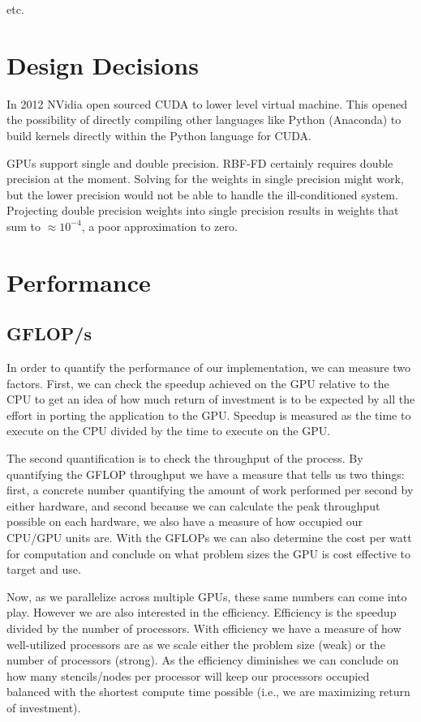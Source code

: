 \documentclass{report}
\begin{document}
\cite{Bell2009} 
\cite{Vuduc2005} etc. 



\section{Design Decisions}

In 2012 NVidia open sourced CUDA to lower level virtual machine. This opened the possibility of directly compiling other languages like Python (Anaconda) to build kernels directly within the Python language for CUDA. 

GPUs support single and double precision. RBF-FD certainly requires double precision at the moment. Solving for the weights in single precision might work, but the lower precision would not be able to handle the ill-conditioned system. Projecting double precision weights into single precision results in weights that sum to $\approx 10^{-4}$, a poor approximation to zero. 


\section{Performance}
\subsection{GFLOP/s}
In order to quantify the performance of our implementation, we can measure two
factors. First, we can check the speedup achieved on the GPU relative to the
CPU to get an idea of how much return of investment is to be expected by all
the effort in porting the application to the GPU. Speedup is measured as the
time to execute on the CPU divided by the time to execute on the GPU. 

The second quantification is to check the throughput of the process. By
quantifying the GFLOP throughput we have a measure that tells us two things:
first, a concrete number quantifying the amount of work performed per second by
either hardware, and second because we can calculate the peak throughput possible on
each hardware, we also have a measure of how occupied our CPU/GPU units are.
With the GFLOPs we can also determine the cost per watt for computation and
conclude on what problem sizes the GPU is cost effective to target and use. 

Now, as we parallelize across multiple GPUs, these same numbers can come into
play. However we are also interested in the efficiency. Efficiency is the
speedup divided by the number of processors. With efficiency we have a measure
of how well-utilized processors are as we scale either the problem size (weak)
or the number of processors (strong). As the efficiency diminishes we can
conclude on how many stencils/nodes per processor will keep our processors
occupied balanced with the shortest compute time possible (i.e., we are
maximizing return of investment). 
\end{document}
